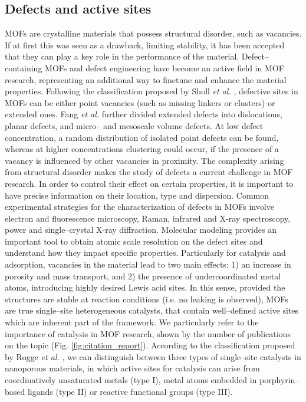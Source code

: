 \subsection*{Defects and active sites}
MOFs are crystalline materials that possess structural disorder, such as vacancies. If at first this was seen as a drawback, limiting stability, it has been accepted that they can play a key role in the performance of the material. Defect--containing MOFs and defect engineering have become an active field in MOF research, representing an additional way to finetune and enhance the material properties. 
Following the classification proposed by Sholl \textit{et al.} \cite{sholl2015defects}, defective sites in MOFs can be either point vacancies (such as missing linkers or clusters) or extended ones. Fang \textit{et al.} \cite{fang2015defect} further divided extended defects into dislocations, planar defects, and micro-- and mesoscale volume defects. 
\npar
At low defect concentration, a random distribution of isolated point defects can be found, whereas at higher concentrations clustering could occur\cite{cliffe2014correlated}, if the presence of a vacancy is influenced by other vacancies in proximity. The complexity arising from structural disorder makes the study of defects a current challenge in MOF research. In order to control their effect on certain properties, it is important to have precise information on their location, type and dispersion. Common experimental strategies for the characterization of defects in MOFs involve electron and fluorescence microscopy, Raman, infrared and X-ray spectroscopy, power and single--crystal X-ray diffraction\cite{fang2015defect}. Molecular modeling provides an important tool to obtain atomic scale resolution on the defect sites and understand how they impact specific properties.
\npar
Particularly for catalysis and adsorption, vacancies in the material lead to two main effects: 1) an increase in porosity and mass transport, and 2) the presence of undercoordinated metal atoms, introducing highly desired Lewis acid sites. 
In this sense, provided the structures are stable at reaction conditions (i.e. no leaking is observed), 
MOFs are true single--site heterogeneous catalysts, that contain well--defined active sites which are inherent part of the framework\cite{yang2019catalysis}. We particularly refer to the importance of catalysis in MOF research, shown by the number of publications on the topic (Fig. \ref{fig:citation_report}). According to the classification proposed by Rogge \textit{et al.} \cite{rogge2017metal}, we can distinguish between three types of single--site catalysts in nanoporous materials, in which active sites for catalysis can arise from coordinatively unsaturated metals (type I), metal atoms embedded in porphyrin--based ligands (type II) or reactive functional groups (type III). 
